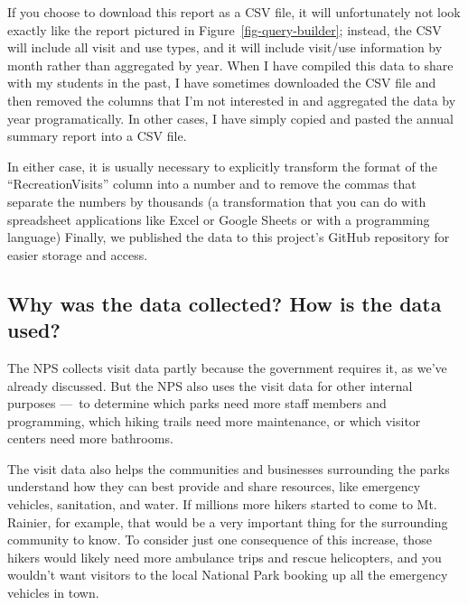 \documentclass[
  letterpaper,
  DIV=11,
  numbers=noendperiod]{scrartcl}
\begin{document}
If you choose to download this report as a CSV file, it will
unfortunately not look exactly like the report pictured in
Figure~\ref{fig-query-builder}; instead, the CSV will include all visit
and use types, and it will include visit/use information by month rather
than aggregated by year. When I have compiled this data to share with my
students in the past, I have sometimes downloaded the CSV file and then
removed the columns that I'm not interested in and aggregated the data
by year programatically. In other cases, I have simply copied and pasted
the annual summary report into a CSV file.

In either case, it is usually necessary to explicitly transform the
format of the ``RecreationVisits'' column into a number and to remove
the commas that separate the numbers by thousands (a transformation that
you can do with spreadsheet applications like Excel or Google Sheets or
with a programming language) Finally, we published the data to this
project's GitHub repository for easier storage and access.

\subsection{Why was the data collected? How is the data
used?}\label{why-was-the-data-collected-how-is-the-data-used}

The NPS collects visit data partly because the government requires it,
as we've already discussed. But the NPS also uses the visit data for
other internal purposes ---~to determine which parks need more staff
members and programming, which hiking trails need more maintenance, or
which visitor centers need more bathrooms.

The visit data also helps the communities and businesses surrounding the
parks understand how they can best provide and share resources, like
emergency vehicles, sanitation, and water. If millions more hikers
started to come to Mt. Rainier, for example, that would be a very
important thing for the surrounding community to know. To consider just
one consequence of this increase, those hikers would likely need more
ambulance trips and rescue helicopters, and you wouldn't want visitors
to the local National Park booking up all the emergency vehicles in
town.
\end{document}
